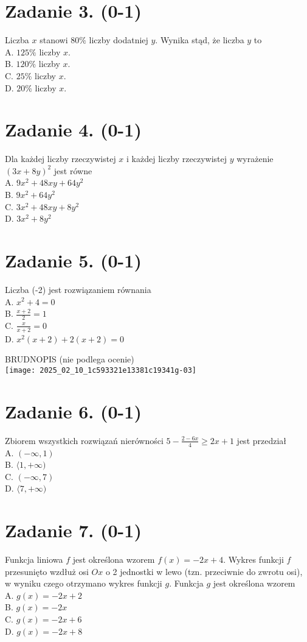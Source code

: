 \documentclass[10pt]{article}
\begin{document}
\section*{Zadanie 3. (0-1)}
Liczba \(x\) stanowi \(80 \%\) liczby dodatniej \(y\). Wynika stąd, że liczba \(y\) to\\
A. \(125 \%\) liczby \(x\).\\
B. \(120 \%\) liczby \(x\).\\
C. \(25 \%\) liczby \(x\).\\
D. \(20 \%\) liczby \(x\).

\section*{Zadanie 4. (0-1)}
Dla każdej liczby rzeczywistej \(x\) i każdej liczby rzeczywistej \(y\) wyrażenie \((3 x+8 y)^{2}\) jest równe\\
A. \(9 x^{2}+48 x y+64 y^{2}\)\\
B. \(9 x^{2}+64 y^{2}\)\\
C. \(3 x^{2}+48 x y+8 y^{2}\)\\
D. \(3 x^{2}+8 y^{2}\)

\section*{Zadanie 5. (0-1)}
Liczba (-2) jest rozwiązaniem równania\\
A. \(x^{2}+4=0\)\\
B. \(\frac{x+2}{2}=1\)\\
C. \(\frac{x}{x+2}=0\)\\
D. \(x^{2}(x+2)+2(x+2)=0\)

BRUDNOPIS (nie podlega ocenie)\\
\texttt{[image: 2025\_02\_10\_1c593321e13381c19341g-03]}

\section*{Zadanie 6. (0-1)}
Zbiorem wszystkich rozwiązań nierówności \(5-\frac{2-6 x}{4} \geq 2 x+1\) jest przedział\\
A. \((-\infty, 1)\)\\
B. \(\langle 1,+\infty)\)\\
C. \((-\infty, 7)\)\\
D. \(\langle 7,+\infty)\)

\section*{Zadanie 7. (0-1)}
Funkcja liniowa \(f\) jest określona wzorem \(f(x)=-2 x+4\). Wykres funkcji \(f\) przesunięto wzdłuż osi \(O x\) o 2 jednostki w lewo (tzn. przeciwnie do zwrotu osi), w wyniku czego otrzymano wykres funkcji \(g\). Funkcja \(g\) jest określona wzorem\\
A. \(g(x)=-2 x+2\)\\
B. \(g(x)=-2 x\)\\
C. \(g(x)=-2 x+6\)\\
D. \(g(x)=-2 x+8\)
\end{document}
